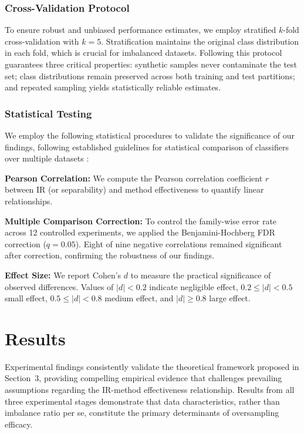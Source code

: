 \documentclass[12pt,a4paper]{article}
\theoremstyle{definition}
\begin{document}
\subsubsection{Cross-Validation Protocol}
To ensure robust and unbiased performance estimates, we employ stratified $k$-fold cross-validation with $k = 5$. Stratification maintains the original class distribution in each fold, which is crucial for imbalanced datasets. Following this protocol guarantees three critical properties: synthetic samples never contaminate the test set; class distributions remain preserved across both training and test partitions; and repeated sampling yields statistically reliable estimates.

\subsubsection{Statistical Testing}
We employ the following statistical procedures to validate the significance of our findings, following established guidelines for statistical comparison of classifiers over multiple datasets \cite{garcia2008extension}:

\textbf{Pearson Correlation:} We compute the Pearson correlation coefficient $r$ between IR (or separability) and method effectiveness to quantify linear relationships.

\textbf{Multiple Comparison Correction:} To control the family-wise error rate across 12 controlled experiments, we applied the Benjamini-Hochberg FDR correction ($q = 0.05$). Eight of nine negative correlations remained significant after correction, confirming the robustness of our findings.

\textbf{Effect Size:} We report Cohen's $d$ to measure the practical significance of observed differences. Values of $|d| < 0.2$ indicate negligible effect, $0.2 \leq |d| < 0.5$ small effect, $0.5 \leq |d| < 0.8$ medium effect, and $|d| \geq 0.8$ large effect.

\section{Results}
\indent Experimental findings consistently validate the theoretical framework proposed in Section~3, providing compelling empirical evidence that challenges prevailing assumptions regarding the IR-method effectiveness relationship. Results from all three experimental stages demonstrate that data characteristics, rather than imbalance ratio per se, constitute the primary determinants of oversampling efficacy.
\end{document}
